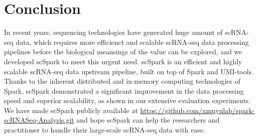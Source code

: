 \documentclass[conference]{IEEEtran}
\begin{document}

\section{Conclusion}

In recent years, sequencing technologies have generated huge amount of scRNA-seq data, which requires more efficienct and scalable scRNA-seq data processing pipelines before the biological meansings of the value can be explored, and we developed scSpark to meet this urgent need. 
scSpark is an efficient and highly scalable scRNA-seq data upstream pipeline, built on top of Spark and UMI-tools.
Thanks to the inherent distributed and in-memory computing technologies of Spark, scSpark demonstrated a significant improvement in the data processing speed and superior scalability, as shown in our extensive evaluation experiments. 
We have made scSpark publicly available at \url{https://github.com/xmuyulab/spark-scRNASeq-Analysis.git} and hope scSpark can help the researchers and practitioner to handle their large-scale scRNA-seq data with ease. 




\end{document}

